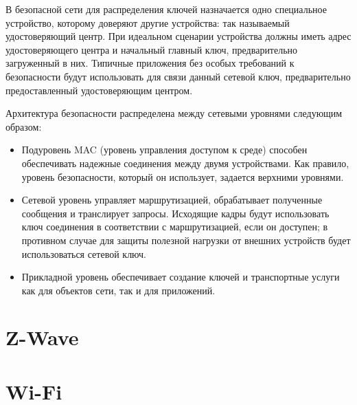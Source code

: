 	В безопасной сети для распределения ключей назначается одно специальное устройство, которому доверяют 
	другие устройства: так называемый удостоверяющий центр. При идеальном сценарии устройства должны 
	иметь адрес удостоверяющего центра и начальный главный ключ, предварительно загруженный в них. 
	Типичные приложения без особых требований к безопасности будут использовать для связи данный сетевой ключ, 
	предварительно предоставленный удостоверяющим центром.
	
	Архитектура безопасности распределена между сетевыми уровнями следующим образом:
	
	\begin{itemize}
		\item Подуровень MAC (уровень управления доступом к среде) способен обеспечивать надежные соединения
		между двумя устройствами. Как правило, уровень безопасности, который он использует, задается 
		верхними уровнями.
		\item Сетевой уровень управляет маршрутизацией, обрабатывает полученные сообщения и транслирует
		запросы. Исходящие кадры будут использовать ключ соединения в соответствии с маршрутизацией, 
		если он доступен; в противном случае для защиты полезной нагрузки от внешних устройств будет 
		использоваться сетевой ключ.
		\item Прикладной уровень обеспечивает создание ключей и транспортные услуги как для объектов
		сети, так и для приложений.
	\end{itemize}

	
	\section{Z-Wave}
	
	
	\section{Wi-Fi}